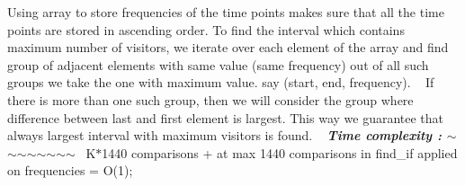 Using array to store frequencies of the time points makes sure that all the time points are stored in ascending order. To find the interval which contains maximum number of visitors, we iterate over each element of the array and find group of adjacent elements with same value (same frequency) out of all such groups we take the one with maximum value. say (start, end, frequency). ~\newline
If there is more than one such group, then we will consider the group where difference between last and first element is largest. This way we guarantee that always largest interval with maximum visitors is found. ~\newline
{\bfseries{{\itshape Time complexity \+: \texorpdfstring{$\sim$}{\string~}\texorpdfstring{$\sim$}{\string~}\texorpdfstring{$\sim$}{\string~}\texorpdfstring{$\sim$}{\string~}\texorpdfstring{$\sim$}{\string~}\texorpdfstring{$\sim$}{\string~}\texorpdfstring{$\sim$}{\string~}\texorpdfstring{$\sim$}{\string~}}}}~\newline
K\texorpdfstring{$\ast$}{*}1440 comparisons + at max 1440 comparisons in find\+\_\+if applied on frequencies = O(1);

